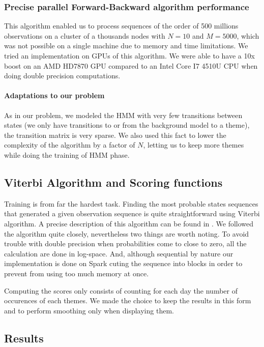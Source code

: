 \subsubsection*{Precise parallel Forward-Backward algorithm performance}
This algorithm enabled us to process sequences of the order of 500 millions observations on a cluster of a thousands nodes with $N=10$ and $M=5000$, which was not possible on a single machine due to memory and time limitations.
We tried an implementation on GPUs of this algorithm. We were able to have a 10x boost on an AMD HD7870 GPU compared to an Intel Core I7 4510U CPU when doing double precision computations.

\paragraph{Adaptations to our problem}
As in our problem, we modeled the HMM with very few transitions between states (we only have transitions to or from the background model to a theme), the transition matrix is very sparse. We also used this fact to lower the complexity of the algorithm by a factor of $N$, letting us to keep more themes while doing the training of HMM phase.

\subsection{Viterbi Algorithm and Scoring functions}
Training is from far the hardest task. Finding the most probable states sequences that generated a given observation sequence is quite straightforward using Viterbi algorithm. A precise description of this algorithm can be found in \cite{rabiner1989tutorial}.
We followed the algorithm quite closely, nevertheless two things are worth noting. To avoid trouble with double precision when probabilities come to close to zero, all the calculation are done in log-space. And, although sequential by nature our implementation is done on Spark cuting the sequence into blocks in order to prevent from using too much memory at once.

Computing the scores only consists of counting for each day the number of occurences of each themes. We made the choice to keep the results in this form and to perform smoothing only when displaying them.

\subsection{Results}




